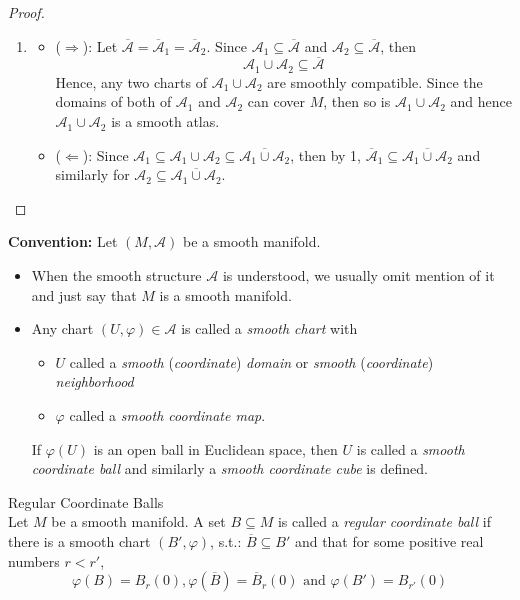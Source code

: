 \begin{proof}
\begin{enumerate}
        \item \begin{itemize}
            \item ($\Rightarrow$): Let $\overline{\mathcal{A}}= \overline{\mathcal{A}}_1= \overline{\mathcal{A}}_2$. Since $\mathcal{A}_1 \subseteq \overline{\mathcal{A}}$ and $\mathcal{A}_2 \subseteq \overline{\mathcal{A}}$, then
            \[
            \mathcal{A}_1 \cup \mathcal{A}_2\subseteq \overline{\mathcal{A}}
            \]
            Hence, any two charts of $\mathcal{A}_1 \cup \mathcal{A}_2$ are smoothly compatible. Since the domains of both of $\mathcal{A}_1$ and $\mathcal{A}_2$ can cover $M$, then so is $\mathcal{A}_1 \cup \mathcal{A}_2$ and hence $\mathcal{A}_1 \cup \mathcal{A}_2$ is a smooth atlas.

            \item ($\Leftarrow$): Since $\mathcal{A}_1 \subseteq \mathcal{A}_1 \cup \mathcal{A}_2 \subseteq \overline{\mathcal{A}_1 \cup \mathcal{A}_2}$, then by 1, $\overline{\mathcal{A}}_1 \subseteq \overline{\mathcal{A}_1 \cup \mathcal{A}_2}$ and similarly for $\mathcal{A}_2 \subseteq \overline{\mathcal{A}_1 \cup \mathcal{A}_2}$.
        \end{itemize}
    \end{enumerate}
\end{proof}

\noindent\textbf{Convention:} Let $(M,\mathcal{A})$ be a smooth manifold.
\begin{itemize}
    \item When the smooth structure $\mathcal{A}$ is understood, we usually omit mention of it and just say that $M$ is a smooth manifold.
    \item Any chart $(U,\varphi) \in \mathcal{A}$ is called a \textit{smooth chart} with
    \begin{itemize}
        \item $U$ called a \textit{smooth} (\textit{coordinate}) \textit{domain} or \textit{smooth} (\textit{coordinate}) \textit{neighborhood}
        \item $\varphi$ called a \textit{smooth coordinate map}.
    \end{itemize}
    If $\varphi(U)$ is an open ball in Euclidean space, then $U$ is called a \textit{smooth coordinate ball} and similarly a \textit{smooth coordinate cube} is defined.
\end{itemize}

\begin{definition}{Regular Coordinate Balls}\\
Let $M$ be a smooth manifold. A set $B \subseteq M$ is called a \textit{regular coordinate ball} if there is a smooth chart $(B', \varphi)$, s.t.: $\overline{B} \subseteq B'$ and that for some positive real numbers $r<r'$,
\[
\varphi(B)= B_r(0), \varphi(\overline{B})= \overline{B}_r(0) \text{ and } \varphi(B') = B_{r'} (0)
\]
\end{definition}

